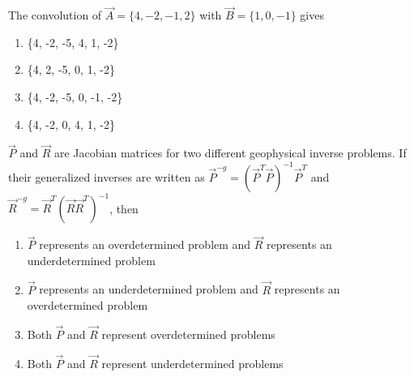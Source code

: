 \item The convolution of $\vec{A} = \{4, -2, -1, 2\}$ with $\vec{B} = \{1, 0, -1\}$ gives
\hfill{}
\begin{multicols}{2}
\begin{enumerate}
    \item \{4, -2, -5, 4, 1, -2\}
    \item \{4, 2, -5, 0, 1, -2\}
    \item \{4, -2, -5, 0, -1, -2\}
    \item \{4, -2, 0, 4, 1, -2\}
\end{enumerate}
\end{multicols}
\item $\vec{P}$ and $\vec{R}$ are Jacobian matrices for two different geophysical inverse problems. If their generalized inverses are written as $\vec{P}^{-g} = (\vec{P}^T \vec{P})^{-1} \vec{P}^T$ and $\vec{R}^{-g} = \vec{R}^T(\vec{R} \vec{R}^T)^{-1}$, then
\hfill{}
\begin{enumerate}
    \item $\vec{P}$ represents an overdetermined problem and $\vec{R}$ represents an underdetermined problem
    \item $\vec{P}$ represents an underdetermined problem and $\vec{R}$ represents an overdetermined problem
    \item Both $\vec{P}$ and $\vec{R}$ represent overdetermined problems
    \item Both $\vec{P}$ and $\vec{R}$ represent underdetermined problems
\end{enumerate}

